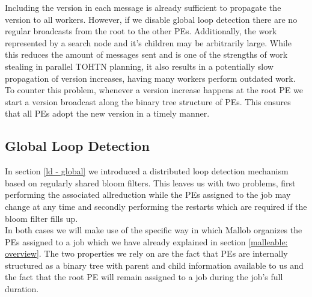 Including the version in each message is already sufficient to propagate the version to all workers. However, if we disable global loop detection there are no regular broadcasts from the root to the other PEs. Additionally, the work represented by a search node and it's children may be arbitrarily large. While this reduces the amount of messages sent and is one of the strengths of work stealing in parallel TOHTN planning, it also results in a potentially slow propagation of version increases, having many workers perform outdated work. To counter this problem, whenever a version increase happens at the root PE we start a version broadcast along the binary tree structure of PEs. This ensures that all PEs adopt the new version in a timely manner.

\subsection{Global Loop Detection}
\label{impl: global loop}
In section \ref{ld - global} we introduced a distributed loop detection mechanism based on regularly shared bloom filters. This leaves us with two problems, first performing the associated allreduction while the PEs assigned to the job may change at any time and secondly performing the restarts which are required if the bloom filter fills up. \\
In both cases we will make use of the specific way in which Mallob organizes the PEs assigned to a job which we have already explained in section \ref{malleable: overview}. The two properties we rely on are the fact that PEs are internally structured as a binary tree with parent and child information available to us and the fact that the root PE will remain assigned to a job during the job's full duration.

